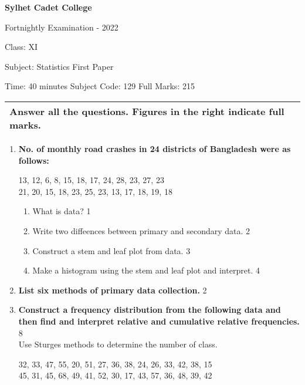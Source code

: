 \documentclass{article}
\begin{document}
\begin{center}
  \bfseries\large
  Sylhet Cadet College

\normalsize
Fortnightly Examination - 2022

  Class: XI

  Subject: Statistics First Paper

  Time: 40 minutes \qquad \qquad  \qquad \qquad Subject Code: 129  \qquad  \qquad \qquad  \qquad Full Marks: 215

\end{center}

\noindent
\begin{tabular}{p{\dimexpr\linewidth-2\tabcolsep}}
  Answer all the questions. Figures in the right indicate full marks.\\
  \hline
\end{tabular}

\begin{enumerate}
  \item
  \textbf{No. of monthly road crashes in 24 districts of Bangladesh were as follows:} 
  
  \begin{center}
  13, 12, 6, 8, 15, 18, 17, 24, 28, 23, 27, 23 \\
  21, 20, 15, 18, 23, 25, 23, 13, 17, 18, 19, 18
  \end{center}
  \begin{enumerate}
    \item
	What is data? \hfill 1
    \item
	Write two diffeences between primary and secondary data. \hfill 2
    \item
	Construct a stem and leaf plot from data. \hfill 3
    \item
	Make a histogram using the stem and leaf plot and interpret. \hfill 4
\end{enumerate}

	\item
	\textbf{List six methods of primary data collection.} \hfill 2 \\
	
	\item
	\textbf{Construct a frequency distribution from the following data and then find and interpret relative and cumulative relative frequencies.}  \hfill 8 \\  Use Sturges methods to determine the number of class. \\ 

  \begin{center}
32, 33, 47, 55, 20, 51, 27, 36, 38, 24, 26, 33, 42, 38, 15 \\
45, 31, 45, 68, 49, 41, 52, 30, 17, 43, 57, 36, 48, 39, 42
  \end{center}
\end{enumerate}
\end{document}
